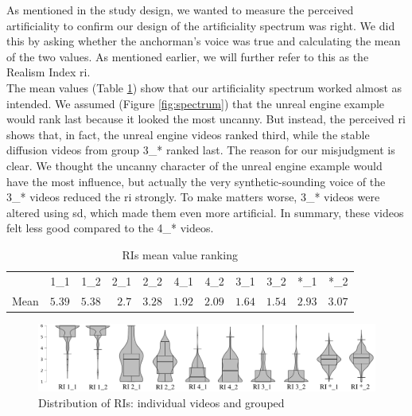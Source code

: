 \documentclass[
  a4paper,  %
  twoside,  %
  bibliography=totoc,
  headsepline,
  cleardoublepage=empty,
  parskip=half,
  draft=false
]{scrbook}
\begin{document}
As mentioned in the study design, we wanted to measure the perceived artificiality to confirm our design of the artificiality spectrum was right. We did this by asking whether the anchorman's voice was true and calculating the mean of the two values. As mentioned earlier, we will further refer to this as the Realism Index \gls{ri}. \\
The mean values (Table \ref{tab:RIs-mean}) show that our artificiality spectrum worked almost as intended. We assumed (Figure \ref{fig:spectrum}) that the unreal engine example would rank last because it looked the most uncanny. But instead, the perceived \gls{ri} shows that, in fact, the unreal engine videos ranked third, while the stable diffusion videos from group 3\_* ranked last. The reason for our misjudgment is clear. We thought the uncanny character of the unreal engine example would have the most influence, but actually the very synthetic-sounding voice of the 3\_* videos reduced the \gls{ri} strongly. To make matters worse, 3\_* videos were altered using \gls{sd}, which made them even more artificial. In summary, these videos felt less good compared to the 4\_* videos.

\begin{table}[h]
	\centering
	\caption{RIs mean value ranking}
	\label{tab:RIs-mean}
	{
		\begin{tabular}{lrrrrrrrrrr}
			\toprule
			 & 1\_1 & 1\_2 & 2\_1 & 2\_2 & 4\_1 & 4\_2 & 3\_1 & 3\_2 & *\_1 & *\_2 \\
			\cmidrule[0.4pt]{1-11}
			Mean & $5.39$ & $5.38$ & $2.7$ & $3.28$ & $1.92$ & $2.09$ & $1.64$ & $1.54$  & $2.93$ & $3.07$\\
			\bottomrule
		\end{tabular}
	}
\end{table}
\begin{figure}[h]
  \includegraphics[width=1\textwidth]{graphics/images/statistics/RIs/RI_compilation.png}
  \caption{Distribution of RIs: individual videos and grouped}
  \label{fig:all-RIs}
\end{figure}
\end{document}

